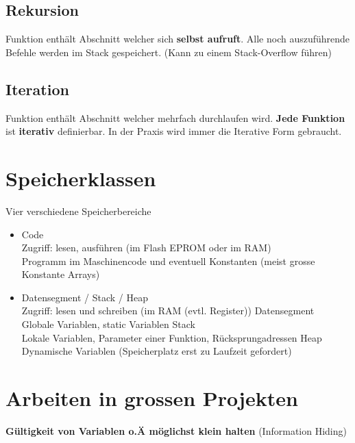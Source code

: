 \documentclass{article}
\begin{document}
\subsection{Rekursion}
Funktion enthält Abschnitt welcher sich \textbf{selbst aufruft}. Alle noch auszuführende Befehle werden im Stack gespeichert. (Kann zu einem Stack-Overflow führen)
\subsection{Iteration}
Funktion enthält Abschnitt welcher mehrfach durchlaufen wird. \textbf{Jede Funktion} ist \textbf{iterativ} definierbar. In der Praxis wird immer die Iterative Form gebraucht.
\section{Speicherklassen}
Vier verschiedene Speicherbereiche
\begin{itemize}
    \item Code\\
    Zugriff: lesen, ausführen (im Flash EPROM oder im RAM) \\
    Programm im Maschinencode und eventuell Konstanten (meist grosse Konstante Arrays)
    \item Datensegment / Stack / Heap \\
    Zugriff: lesen und schreiben (im RAM (evtl. Register))
    \subitem Datensegment \\
    Globale Variablen, static Variablen
    \subitem Stack \\
    Lokale Variablen, Parameter einer Funktion, Rücksprungadressen
    \subitem Heap \\
    Dynamische Variablen (Speicherplatz erst zu Laufzeit gefordert)
\end{itemize}
\section{Arbeiten in grossen Projekten}
\textbf{Gültigkeit von Variablen o.Ä möglichst klein halten} (Information Hiding)
\end{document}
